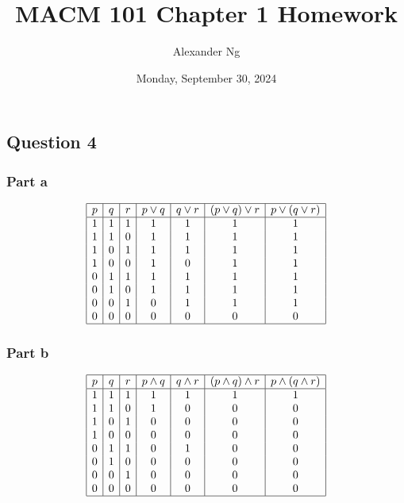 \documentclass[12pt]{article}
\begin{document}
\title{MACM 101 Chapter 1 Homework}
\author{Alexander Ng}
\date{Monday, September 30, 2024}

\maketitle 

\subsection*{Question 4}

\subsubsection*{Part a}

\[
\begin{array}{|c|c|c|c|c|c|c|c|}
\hline
p & q & r & p \lor q & q \lor r & (p \lor q) \lor r & p \lor (q \lor r) \\
\hline
1 & 1 & 1 & 1 & 1 & 1 & 1 \\
1 & 1 & 0 & 1 & 1 & 1 & 1 \\
1 & 0 & 1 & 1 & 1 & 1 & 1 \\
1 & 0 & 0 & 1 & 0 & 1 & 1 \\
0 & 1 & 1 & 1 & 1 & 1 & 1 \\
0 & 1 & 0 & 1 & 1 & 1 & 1 \\
0 & 0 & 1 & 0 & 1 & 1 & 1 \\
0 & 0 & 0 & 0 & 0 & 0 & 0 \\
\hline
\end{array}
\]

\subsubsection*{Part b}

\[
\begin{array}{|c|c|c|c|c|c|c|c|}
\hline
p & q & r & p \land q & q \land r & (p \land q) \land r & p \land (q \land r) \\
\hline
1 & 1 & 1 & 1 & 1 & 1 & 1 \\
1 & 1 & 0 & 1 & 0 & 0 & 0 \\
1 & 0 & 1 & 0 & 0 & 0 & 0 \\
1 & 0 & 0 & 0 & 0 & 0 & 0 \\
0 & 1 & 1 & 0 & 1 & 0 & 0 \\
0 & 1 & 0 & 0 & 0 & 0 & 0 \\
0 & 0 & 1 & 0 & 0 & 0 & 0 \\
0 & 0 & 0 & 0 & 0 & 0 & 0 \\
\hline
\end{array}
\]
\end{document}
